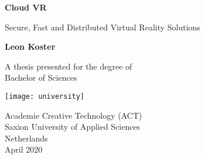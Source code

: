 \begin{titlepage}
   \begin{center}
       \vspace*{1cm}

       \textbf{Cloud VR}

       \vspace{0.5cm}
        Secure, Fast and Distributed Virtual Reality Solutions
            
       \vspace{1.5cm}

       \textbf{Leon Koster}

       \vfill
            
       A thesis presented for the degree of\\
       Bachelor of Sciences
            
       \vspace{0.8cm}
     
      \texttt{[image: university]}
            
       Academie Creative Technology (ACT)\\
       Saxion University of Applied Sciences\\
       Netherlands\\
       April 2020
            
   \end{center}
\end{titlepage}